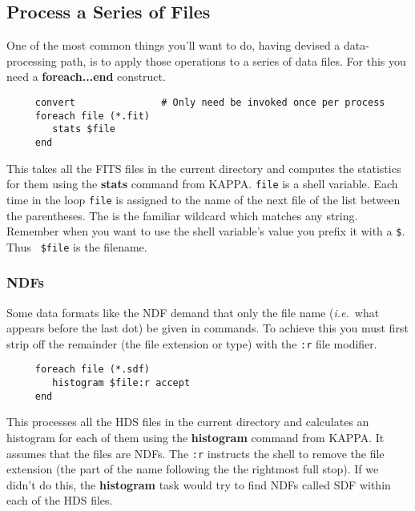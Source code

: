 \documentclass[twoside,11pt]{article}
\newcommand{\htmlref}[2]{#1}
\newcommand{\xref}[3]{#1}
\newcommand{\xlabel}[1]{}
\newcommand{\HDSref}{\xref{HDS}{sun92}{}}
\newcommand{\KAPPAref}{\xref{{\footnotesize KAPPA}}{sun95}{}}
\newcommand{\NDFref}[1]{\xref{#1}{sun33}{}}
\begin{document}
\newpage
\subsection{\xlabel{sc4_se_series_files}Process a Series of Files
\label{sc4_se_series_files}}

One of the most common things you'll want to do, having devised
a data-processing path, is to apply those operations to a series
of data files.   For this you need a {\bf foreach...end} construct.

\small
\begin{verbatim}
     convert               # Only need be invoked once per process
     foreach file (*.fit)
        stats $file
     end
\end{verbatim}
\normalsize
This takes all the \htmlref{{\sf FITS}}{sc4_gl_fits} files in the
current directory and computes the statistics for them using the
\xref{{\bf stats}}{sun95}{STATS} command from \KAPPAref\normalsize\@.  {\tt file}
is a \htmlref{{\sf shell variable}}{sc4_gl_she_var}.  Each time in the
loop {\tt file} is assigned to the name of the next file of the list
between the parentheses.  The {\tt *} is the familiar 
\htmlref{{\sf wildcard}}{sc4_gl_wild} which
matches any string.  Remember when you want to use the shell
variable's value you prefix it with a {\tt \$}.  Thus {\tt
\$file} is the filename.

\subsubsection{\xlabel{sc4_se_series_ndfs}NDFs\label{sc4_se_series_ndfs}}

Some data formats like the \NDFref{{\sf NDF}} demand that only the file
name ({\em i.e.}\ what appears before the last dot) be given in
commands.  To achieve this you must first strip off the remainder (the
file extension or type) with the {\tt :r} {\sf file modifier}.

\small
\begin{verbatim}
     foreach file (*.sdf)
        histogram $file:r accept
     end
\end{verbatim}
\normalsize

This processes all the {\sf \HDSref} files in the current directory
and calculates an histogram for each of them using the
\xref{{\bf histogram}}{sun95}{HISTOGRAM} command from
\KAPPAref\normalsize\@.  It
assumes that the files are NDFs.  The {\tt :r}
instructs the shell to remove the file extension (the part of the name
following the the rightmost full stop).  If we didn't do this, the {\bf
histogram} task would try to find NDFs called SDF within each of the
HDS files.
\end{document}
